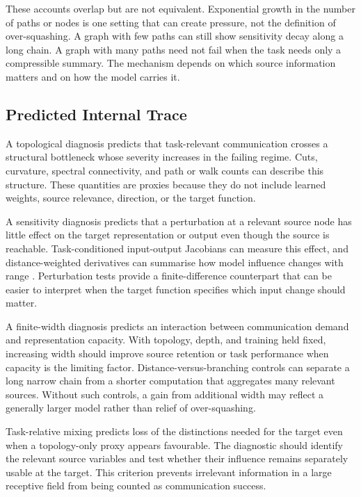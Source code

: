 These accounts overlap but are not equivalent.
Exponential growth in the number of paths or nodes is one setting that can create pressure, not the definition of over-squashing.
A graph with few paths can still show sensitivity decay along a long chain.
A graph with many paths need not fail when the task needs only a compressible summary.
The mechanism depends on which source information matters and on how the model carries it.

\subsection{Predicted Internal Trace}

A topological diagnosis predicts that task-relevant communication crosses a structural bottleneck whose severity increases in the failing regime.
Cuts, curvature, spectral connectivity, and path or walk counts can describe this structure.
These quantities are proxies because they do not include learned weights, source relevance, direction, or the target function.

A sensitivity diagnosis predicts that a perturbation at a relevant source node has little effect on the target representation or output even though the source is reachable.
Task-conditioned input-output Jacobians can measure this effect, and distance-weighted derivatives can summarise how model influence changes with range \cite{bamberger2025measuring}.
Perturbation tests provide a finite-difference counterpart that can be easier to interpret when the target function specifies which input change should matter.

A finite-width diagnosis predicts an interaction between communication demand and representation capacity.
With topology, depth, and training held fixed, increasing width should improve source retention or task performance when capacity is the limiting factor.
Distance-versus-branching controls can separate a long narrow chain from a shorter computation that aggregates many relevant sources.
Without such controls, a gain from additional width may reflect a generally larger model rather than relief of over-squashing.

Task-relative mixing predicts loss of the distinctions needed for the target even when a topology-only proxy appears favourable.
The diagnostic should identify the relevant source variables and test whether their influence remains separately usable at the target.
This criterion prevents irrelevant information in a large receptive field from being counted as communication success.

